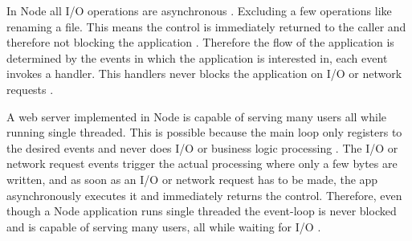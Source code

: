 In Node all I/O operations are asynchronous \cite{chaniotis2015node}. Excluding a few operations like renaming a file. This means the control is immediately returned to the caller and therefore not blocking the application \cite{tilkov2010node}. Therefore the flow of the application is determined by the events in which the application is interested in, each event invokes a handler. This handlers never blocks the application on I/O or network requests \cite{doglio2015pro}.

A web server implemented in Node is capable of serving many users all while running single threaded. This is possible because the main loop only registers to the desired events and never does I/O or business logic processing \cite{tilkov2010node}. The I/O or network request events trigger the actual processing where only a few bytes are written, and as soon as an I/O or network request has to be made, the app asynchronously executes it and immediately returns the control. Therefore, even though a Node application runs single threaded the event-loop is never blocked and is capable of serving many users, all while waiting for I/O \cite{tilkov2010node}.

